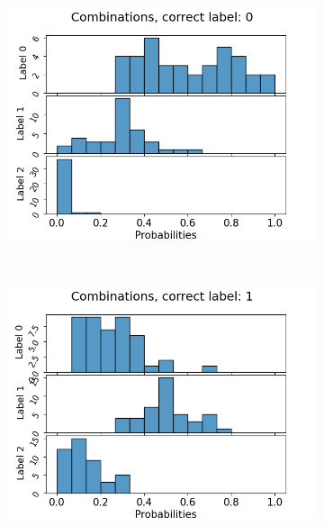 \begin{figure}
  \begin{subfigure}[t]{0.3\textwidth}
    \includegraphics[width=\textwidth]{files/figs/app/hists/femval/c0.png}
  \end{subfigure}
  ~
  \begin{subfigure}[t]{0.3\textwidth}
    \includegraphics[width=\textwidth]{files/figs/app/hists/femval/c1.png}
  \end{subfigure}
  ~
  \begin{subfigure}[t]{0.3\textwidth}

\end{subfigure}
\end{figure}
